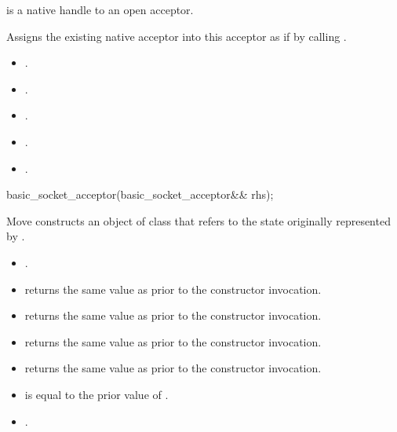 \begin{itemdescr}
\pnum
\requires {} is a native handle to an open acceptor.

\pnum
\effects Assigns the existing native acceptor into this acceptor as if by calling .

\pnum
\postconditions
\begin{itemize}
\item
{}.
\item
{}.
\item
{}.
\item
{}.
\item
{}.
\end{itemize}
\end{itemdescr}

\begin{itemdecl}
basic_socket_acceptor(basic_socket_acceptor&& rhs);
\end{itemdecl}

\begin{itemdescr}
\pnum
\effects Move constructs an object of class  that refers to the state originally represented by .

\pnum
\postconditions
\begin{itemize}
\item
{}.
\item
{} returns the same value as  prior to the constructor invocation.
\item
{} returns the same value as  prior to the constructor invocation.
\item
{} returns the same value as  prior to the constructor invocation.
\item
{} returns the same value as  prior to the constructor invocation.
\item
{} is equal to the prior value of .
\item
{}.
\end{itemize}
\end{itemdescr}

